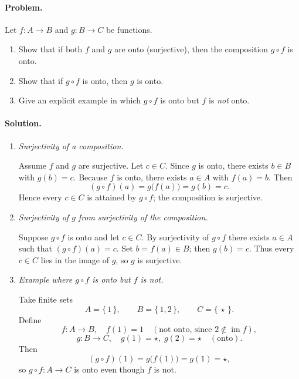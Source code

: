 \documentclass[12pt]{article}
\theoremstyle{definition} %
\theoremstyle{plain} %
\begin{document}
\paragraph{Problem.}
Let \(f:A\to B\) and \(g:B\to C\) be functions.
\begin{enumerate}[label=\textbf{(\alph*)}]
   \item Show that if both \(f\) and \(g\) are onto (surjective), then
         the composition \(g\circ f\) is onto.
   \item Show that if \(g\circ f\) is onto, then \(g\) is onto.
   \item Give an explicit example in which \(g\circ f\) is onto but
         \(f\) is \emph{not} onto.
\end{enumerate}

\bigskip
\paragraph{Solution.}

\begin{enumerate}[label=\textbf{(\alph*)}]
\item \textit{Surjectivity of a composition.}

   Assume \(f\) and \(g\) are surjective.
   Let \(c\in C\).  
   Since \(g\) is onto, there exists \(b\in B\) with \(g(b)=c\).
   Because \(f\) is onto, there exists \(a\in A\) with \(f(a)=b\).
   Then
   \[
      (g\circ f)(a)=g\bigl(f(a)\bigr)=g(b)=c.
   \]
   Hence every \(c\in C\) is attained by \(g\circ f\); the composition
   is surjective.

\item \textit{Surjectivity of \(g\) from surjectivity of the
   composition.}

   Suppose \(g\circ f\) is onto and let \(c\in C\).
   By surjectivity of \(g\circ f\) there exists \(a\in A\) such that
   \((g\circ f)(a)=c\).
   Set \(b=f(a)\in B\); then \(g(b)=c\).
   Thus every \(c\in C\) lies in the image of \(g\), so \(g\) is
   surjective.

\item \textit{Example where \(g\circ f\) is onto but \(f\) is not.}

   Take finite sets
   \[
      A=\{\,1\,\},\qquad
      B=\{\,1,2\,\},\qquad
      C=\{\,\star\,\}.
   \]
   Define
   \[
      f:A\longrightarrow B,\quad f(1)=1
      \quad(\text{not onto, since }2\notin\operatorname{im}f),
   \]
   \[
      g:B\longrightarrow C,\quad g(1)=\star,\; g(2)=\star
      \quad(\text{onto}).
   \]
   Then
   \[
      (g\circ f)(1)=g\bigl(f(1)\bigr)=g(1)=\star,
   \]
   so \(g\circ f:A\to C\) is onto even though \(f\) is not.

\end{enumerate}
\end{document}
